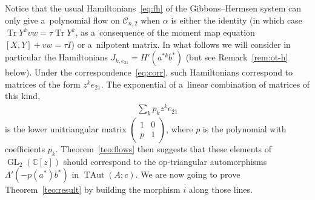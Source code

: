 \documentclass[pdftex]{sigma}
\newcommand{\bb}[1]{\mathbb{#1}}
\newcommand{\smm}[1]{\left(\begin{smallmatrix} #1\end{smallmatrix}\right)}
\DeclareMathOperator{\tr}{Tr}
\DeclareMathOperator{\GL}{GL}
\DeclareMathOperator{\TAut}{TAut}
\begin{document}
Notice that the usual Hamiltonians~\eqref{eq:fh} of the Gibbons--Hermsen system can only give a~polynomial
f\/low on \(\mathcal{C}_{n,2}\) when \(\alpha\) is either the identity (in which case \(\tr Y^{k}vw = \tau
\tr Y^{k}\), as a~consequence of the moment map equation \([X,Y]+vw = \tau I\)) or a~nilpotent matrix.
In what follows we will consider in particular the Hamiltonians \(J_{k,e_{21}} = H'(a^{*k}b^{*})\) (but see
Remark~\ref{rem:ot-h} below).
Under the correspondence~\eqref{eq:corr}, such Hamiltonians correspond to matrices of the form
\(z^{k}e_{21}\).
The exponential of a~linear combination of matrices of this kind,
\begin{gather*}
\sum_{k}p_{k}z^{k}e_{21}
\end{gather*}
is the lower unitriangular matrix \(\smm{1 & 0
\\
p & 1}\), where \(p\) is the polynomial with coef\/f\/icients \(p_{k}\).
Theo\-rem~\ref{teo:flows} then suggests that these elements of \(\GL_{2}(\bb{C}[z])\) should correspond to
the op-triangular automorphisms \(\Lambda'(-p(a^{*})b^{*})\) in \(\TAut(A;c)\).
We are now going to prove Theorem~\ref{teo:result} by building the morphism \(i\) along those lines.
\end{document}
